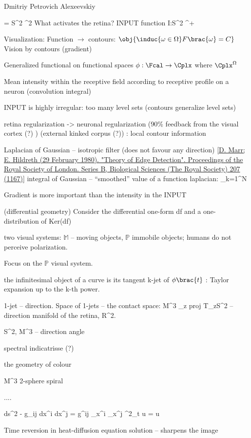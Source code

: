 Dmitriy Petrovich Alexeevskiy

\Omega = S^2 \subset \Real^2
What activates the retina? 
INPUT function I:S^2 \to\Real^+
 

Visualization:
Function $\to$ contours: $\obj{ \induc{ \omega\in \Omega} F\brac{\omega} = C }$
Vision by contours (gradient)

Generalized functional on functional spaces $\phi:\Fcal\to \Cplx$ where \Fcal\subseteq $\Cplx^\Omega$

Mean intensity within the receptive field according to receptive profile on a neuron (convolution integral)

INPUT is highly irregular: too many level sets (contours generalize level sets)

retina regularization -> neuronal regularization (90\% feedback from the visual cortex (?) ) (external kinked corpus (?)) : local contour information

Laplacian of Gaussian -- isotropic filter (does not favour any direction) \ref{D. Marr; E. Hildreth (29 February 1980). "Theory of Edge Detection". Proceedings of the Royal Society of London. Series B, Biological Sciences (The Royal Society) 207 (1167)}
integral of Gaussian -- ``smoothed'' value of a function
laplacian: \sum_{k=1}^N 

Gradient is more important than the intensity in the INPUT

(differential geometry)
Consider the differential one-form df and a one-distribution of Ker(df)

two visual systems: $\mathbb{M}$ -- moving objects, $\mathbb{P}$ immobile objects; humans do not perceive polarization.

Focus on the $\mathbb{P}$ visual system.

the infinitesimal object of a curve is its tangent
k-jet of $\phi\brac{t}$ : Taylor expansion up to the k-th power.


1-jet -- direction. Space of 1-jets -- the contact space: M^3  \bigcup_z proj T_zS^2 -- direction manifold of the retina, R\subseteq \Real^2.

\in S^2, \in M^3 -- \theta direction angle

spectral indicatrisse (?)

the geometry of colour

 \in M^3 
2-sphere \to spiral

....

ds^2 - g_{ij} dx^i dx^j
\Delta = g^{ij} \partial_{x^i} \partial_{x^j}
\partial^2_t u = \Delta u

Time reversion in heat-diffusion equation solution -- sharpens the image


